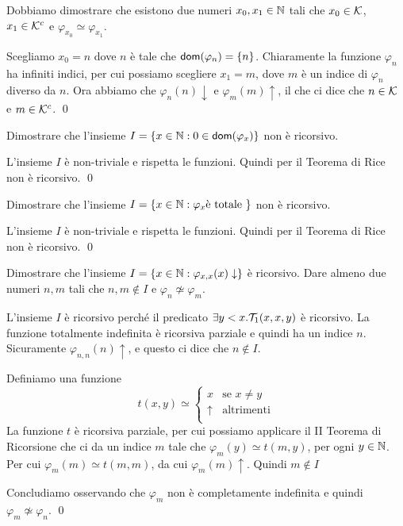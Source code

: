 \documentclass[runningheads,a4paper]{llncs}
\begin{document}
\begin{solution}
Dobbiamo dimostrare che esistono due numeri $x_0,x_1 \in\mathbb{N}$ tali che $x_0 \in \mathcal{K}$, $x_1 \in \mathcal{K}^c$ e $\varphi_{x_0} \simeq \varphi_{x_1}$.

Scegliamo $x_0=n$ dove $n$ \`{e} tale che $\mathsf{dom}(\varphi_n) = \{n\}$. Chiaramente la funzione $\varphi_n$ ha infiniti indici, per cui possiamo
 scegliere $x_1 = m$, dove $m$ \`{e} un indice di $\varphi_n$ diverso da $n$. Ora abbiamo che $\varphi_n(n)\downarrow$ e
 $\varphi_m(m)\uparrow$, il che ci dice che $n \in \mathcal{K}$ e $m \in \mathcal{K}^c$.
\qed\end{solution}

\begin{exercise}
Dimostrare che l'insieme $I=\{x \in \mathbb{N} : 0 \in \mathsf{dom}(\varphi_x)\}$ non \`{e} ricorsivo.
\end{exercise}

\begin{solution}
L'insieme $I$ \`{e} non-triviale e rispetta le funzioni. Quindi per il Teorema di Rice non \`{e} ricorsivo.
\qed\end{solution}

\begin{exercise}
Dimostrare che l'insieme $I=\{x \in \mathbb{N} : \varphi_x \text{\`{e} totale }\}$ non \`{e} ricorsivo.
\end{exercise}

\begin{solution}
L'insieme $I$ \`{e} non-triviale e rispetta le funzioni. Quindi per il Teorema di Rice non \`{e} ricorsivo.
\qed\end{solution}

\begin{exercise}
Dimostrare che l'insieme $I=\{x \in \mathbb{N} : \varphi_{x,x}(x)\downarrow\}$ \`{e} ricorsivo. Dare almeno due numeri $n,m$ tali che
 $n,m \not\in I$ e $\varphi_n \not\simeq \varphi_m$.
\end{exercise}

\begin{solution}
L'insieme $I$ \`{e} ricorsivo perch\'{e} il predicato $\exists y<x.\mathcal{T}_1(x,x,y)$ \`{e} ricorsivo.
 La funzione totalmente indefinita \`{e} ricorsiva parziale e quindi ha un indice $n$. Sicuramente $\varphi_{n,n}(n)\uparrow$, e questo ci dice che
 $n \not\in I$.

Definiamo una funzione 
$$
t(x,y) \simeq
\begin{cases}
x        & \mbox{se $x \neq y$} \\
\uparrow & \mbox{altrimenti} \\
\end{cases}
$$
La funzione $t$ \`{e} ricorsiva parziale, per cui possiamo applicare il II Teorema di Ricorsione che ci da 
 un indice $m$ tale che $\varphi_{m}(y) \simeq t(m,y)$, per ogni $y \in \mathbb{N}$. Per cui $\varphi_m(m) \simeq t(m,m)$,
 da cui $\varphi_m(m)\uparrow$. Quindi $m \not\in I$

Concludiamo osservando che $\varphi_m$ non \`{e} completamente indefinita e quindi $\varphi_m \not\simeq \varphi_n$.
\qed\end{solution}
\end{document}
